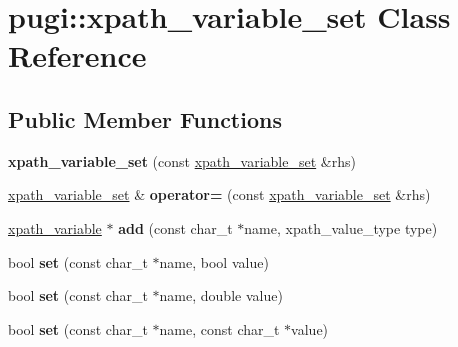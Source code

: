 \hypertarget{classpugi_1_1xpath__variable__set}{}\section{pugi\+:\+:xpath\+\_\+variable\+\_\+set Class Reference}
\label{classpugi_1_1xpath__variable__set}
\subsection*{Public Member Functions}
\begin{DoxyCompactItemize}
\item 
\mbox{\label{classpugi_1_1xpath__variable__set_a7d565f9a16cab4a304d9daf93f04f9c5}} 
{\bfseries xpath\+\_\+variable\+\_\+set} (const \hyperlink{classpugi_1_1xpath__variable__set}{xpath\+\_\+variable\+\_\+set} \&rhs)
\item 
\mbox{\label{classpugi_1_1xpath__variable__set_aee3129249af627510bbee5c0b07dc677}} 
\hyperlink{classpugi_1_1xpath__variable__set}{xpath\+\_\+variable\+\_\+set} \& {\bfseries operator=} (const \hyperlink{classpugi_1_1xpath__variable__set}{xpath\+\_\+variable\+\_\+set} \&rhs)
\item 
\mbox{\label{classpugi_1_1xpath__variable__set_a07051524f1c6a54bf8f16c9506d6ed5e}} 
\hyperlink{classpugi_1_1xpath__variable}{xpath\+\_\+variable} $\ast$ {\bfseries add} (const char\+\_\+t $\ast$name, xpath\+\_\+value\+\_\+type type)
\item 
\mbox{\label{classpugi_1_1xpath__variable__set_a461660115640e623fe53af3d9f6b7a05}} 
bool {\bfseries set} (const char\+\_\+t $\ast$name, bool value)
\item 
\mbox{\label{classpugi_1_1xpath__variable__set_a74c45684cc9b790601830f5c51bb8b89}} 
bool {\bfseries set} (const char\+\_\+t $\ast$name, double value)
\item 
\mbox{\label{classpugi_1_1xpath__variable__set_a6c97731437c5aa4d57b72185ee03451c}} 
bool {\bfseries set} (const char\+\_\+t $\ast$name, const char\+\_\+t $\ast$value)

\end{DoxyCompactItemize}
